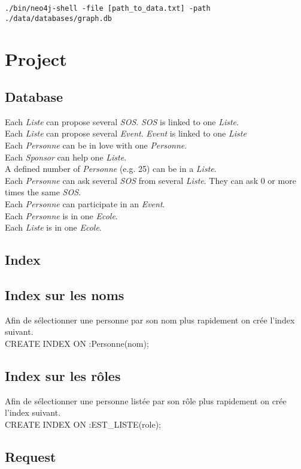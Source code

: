 \documentclass[a4paper,oneside,1pt]{article}
\begin{document}
\texttt{./bin/neo4j-shell -file [path\_to\_data.txt] -path ./data/databases/graph.db}

\section{Project}

\subsection{Database}


Each \textit{Liste} can propose several \textit{SOS}. \textit{SOS} is linked to one \textit{Liste}. \\
Each \textit{Liste} can propose several \textit{Event}. \textit{Event} is linked to one \textit{Liste} \\
Each \textit{Personne} can be in love with one \textit{Personne}. \\
Each \textit{Sponsor} can help one \textit{Liste}. \\
A defined number of \textit{Personne} (e.g. 25) can be in a \textit{Liste}. \\
Each \textit{Personne} can ask several \textit{SOS} from several \textit{Liste}. They can ask 0 or more times the same \textit{SOS}. \\
Each \textit{Personne} can participate in an \textit{Event}. \\
Each \textit{Personne} is in one \textit{Ecole}. \\
Each \textit{Liste} is in one \textit{Ecole}. \\
\subsection{Index}
\subsection{Index sur les noms}
Afin de sélectionner une personne par son nom plus rapidement on crée l'index suivant.
\\
CREATE INDEX ON :Personne(nom);
\subsection{Index sur les rôles}
Afin de sélectionner une personne listée par son rôle plus rapidement on crée l'index suivant.
\\
CREATE INDEX ON :EST\_LISTE(role);
\subsection{Request}
\end{document}
